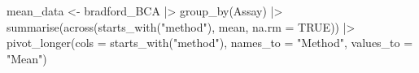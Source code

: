 \documentclass[
  letterpaper,
  DIV=11,
  numbers=noendperiod]{scrreprt}
\newenvironment{Shaded}{\begin{snugshade}}{\end{snugshade}}
\newcommand{\AttributeTok}[1]{\textcolor[rgb]{0.40,0.45,0.13}{#1}}
\newcommand{\ConstantTok}[1]{\textcolor[rgb]{0.56,0.35,0.01}{#1}}
\newcommand{\FunctionTok}[1]{\textcolor[rgb]{0.28,0.35,0.67}{#1}}
\newcommand{\NormalTok}[1]{\textcolor[rgb]{0.00,0.23,0.31}{#1}}
\newcommand{\OtherTok}[1]{\textcolor[rgb]{0.00,0.23,0.31}{#1}}
\newcommand{\SpecialCharTok}[1]{\textcolor[rgb]{0.37,0.37,0.37}{#1}}
\newcommand{\StringTok}[1]{\textcolor[rgb]{0.13,0.47,0.30}{#1}}
\begin{document}
\begin{Shaded}
\begin{Highlighting}[]
\NormalTok{mean\_data }\OtherTok{\textless{}{-}}
\NormalTok{  bradford\_BCA }\SpecialCharTok{|\textgreater{}} 
  \FunctionTok{group\_by}\NormalTok{(Assay) }\SpecialCharTok{|\textgreater{}} 
  \FunctionTok{summarise}\NormalTok{(}\FunctionTok{across}\NormalTok{(}\FunctionTok{starts\_with}\NormalTok{(}\StringTok{"method"}\NormalTok{), mean, }\AttributeTok{na.rm =} \ConstantTok{TRUE}\NormalTok{)) }\SpecialCharTok{|\textgreater{}} 
  \FunctionTok{pivot\_longer}\NormalTok{(}\AttributeTok{cols =} \FunctionTok{starts\_with}\NormalTok{(}\StringTok{"method"}\NormalTok{),}
               \AttributeTok{names\_to =} \StringTok{"Method"}\NormalTok{,}
               \AttributeTok{values\_to =} \StringTok{"Mean"}\NormalTok{)}


\end{Highlighting}
\end{Shaded}
\end{document}
